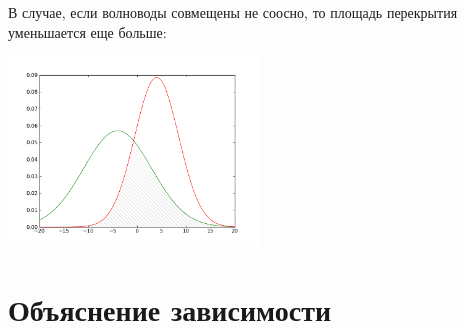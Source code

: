 В случае, если волноводы совмещены не соосно, то площадь перекрытия уменьшается еще больше:

\includegraphics[width=0.5\textwidth]{img/intersection2.png}

\section{Объяснение зависимости}

